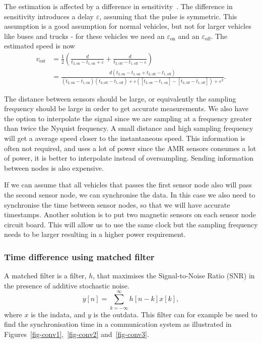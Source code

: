 The estimation is affected by a difference in sensitivity~\cite{path2007}. The difference in sensitivity introduces a delay $\varepsilon$, assuming that the pulse is symmetric. This assumption is a good assumption for normal vehicles, but not for larger vehicles like buses and trucks - for these vehicles we need an $\varepsilon_\text{on}$ and an $\varepsilon_\text{off}$. The estimated speed is now
\begin{align}
 v_{\text{est}} &= \frac{1}{2}\left(\frac{d}{t_{2,\text{on}}-t_{1,\text{on}} + \varepsilon} + \frac{d}{t_{2,\text{off}} - t_{1,\text{off}} - \varepsilon}\right)\\
 & =\frac{d\left(t_{2,\text{on}}-t_{1,\text{on}}+ t_{2,\text{off}} - t_{1,\text{off}}\right)}{(t_{2,\text{on}}-t_{1,\text{on}})(t_{2,\text{off}} - t_{1,\text{off}})+ \varepsilon\left([t_{2,\text{on}}-t_{1,\text{on}}]- [t_{2,\text{off}} - t_{1,\text{off}}]\right) + \varepsilon^2}.
\end{align}

The distance between sensors should be large, or equivalently the sampling frequency should be large in order to get accurate measurements. We also have the option to interpolate the signal since we are sampling at a frequency greater than twice the Nyquist frequency. A small distance and high sampling frequency will get a average speed closer to the instantaneous speed. This information is often not required, and uses a lot of power since the AMR sensors consumes a lot of power, it is better to interpolate instead of oversampling. Sending information between nodes is also expensive. %

If we can assume that all vehicles that passes the first sensor node also will pass the second sensor node, we can synchronise the data. In this case we also need to synchronise the time between sensor nodes, so that we will have accurate timestamps. Another solution is to put two magnetic sensors on each sensor node circuit board. This will allow us to use the same clock but the sampling frequency needs to be larger resulting in a higher power requirement.

\subsubsection{Time difference using matched filter}
A matched filter is a filter, $h$, that maximises the Signal-to-Noise Ratio (SNR) in the presence of additive stochastic noise.
\begin{equation}
 y[n] = \sum_{k=-\infty}^{\infty} h[n-k] x[k], 
\end{equation}
where $x$ is the indata, and $y$ is the outdata. This filter can for example be used to find the synchronisation time in a communication system as illustrated in Figures~\ref{fig-conv1},~\ref{fig-conv2} and~\ref{fig-conv3}.

